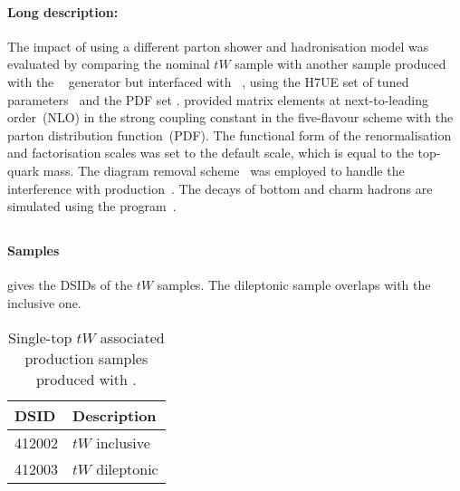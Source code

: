 \paragraph{Long description:}

The impact of using a different parton shower and hadronisation model was evaluated
by comparing the nominal $tW$ sample with another sample produced with the
\POWHEGBOX[v2]~\cite{Re:2010bp,Nason:2004rx,Frixione:2007vw,Alioli:2010xd}
generator but interfaced with \HERWIG[7.04]~\cite{Bahr:2008pv,Bellm:2015jjp},
using the H7UE set of tuned parameters~\cite{Bellm:2015jjp} and the
\MMHT[lo] PDF set \cite{Harland-Lang:2014zoa}.
\POWHEGBOX provided matrix elements at next-to-leading order~(NLO) in the 
strong coupling constant \alphas in the five-flavour scheme with the 
\NNPDF[3.0nlo]~\cite{Ball:2014uwa} parton distribution function~(PDF).  
The functional form of the renormalisation and factorisation scales was set to 
the default scale, which is equal to the top-quark mass.  The diagram removal
scheme~\cite{Frixione:2008yi} was employed to handle the interference
with \ttbar production~\cite{ATL-PHYS-PUB-2016-020}.  The decays of bottom
and charm hadrons are simulated using the \EVTGEN[1.6.0]
program~\cite{Lange:2001uf}.


\subsection[MadGraph5\_aMC@NLO+Pythia8]{\MGNLOPY[8]}
\label{subsubsec:tW_aMCP8}

\paragraph{Samples}

 gives the DSIDs of the $tW$ \MGNLOPY[8] samples.
The dileptonic sample overlaps with the inclusive one.

\begin{table}[htbp]
  \caption{Single-top $tW$ associated production samples produced with \MGNLOPY[8].}%
  \label{tab:tW_aMCP8}
  \centering
  \begin{tabular}{l l}
    \toprule
    DSID & Description \\
    \midrule
    412002 & $tW$ inclusive \\
    412003 & $tW$ dileptonic \\
    \bottomrule
  \end{tabular}
\end{table}

